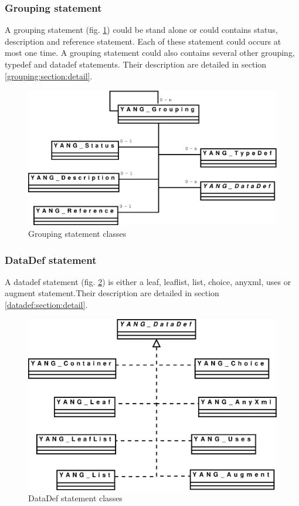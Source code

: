 \documentclass[a4paper]{article}
\begin{document}
\subsubsection{Grouping statement}
\label{grouping:section:global}

A  grouping statement (fig.  \ref{grouping}) could  be stand  alone or
could contains  status, description  and reference statement.  Each of
these statement  could occurs at  most one time. A  grouping statement
could  also  contains  several  other grouping,  typedef  and  datadef
statements. Their     description     are     detailed     in     section
\ref{grouping:section:detail}.
\begin{figure}[htbp]
\begin{center}
\includegraphics[scale = .3]{grouping.eps}
\end{center}
\caption{Grouping statement classes}
\label{grouping}
\end{figure}

\subsubsection{DataDef statement}
\label{datadef:section:global}

A datadef  statement (fig. \ref{datadef}) is either  a leaf, leaflist,
list, choice,  anyxml, uses or augment  statement.Their description are
detailed in section \ref{datadef:section:detail}.
\begin{figure}[htbp]
\begin{center}
\includegraphics[scale = .3]{datadef.eps}
\end{center}
\caption{DataDef statement classes}
\label{datadef}
\end{figure}
\end{document}

